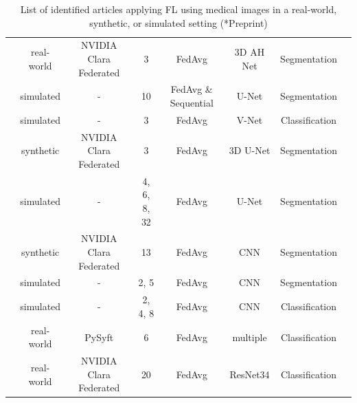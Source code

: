 \begin{table}
\begin{adjustbox}{width=1.0\textheight}
\begin{tabular}{cccccccc}
    \cite{Sarma2021FederatedSharing}                    & real-world & NVIDIA Clara Federated   & 3             & FedAvg                    & 3D AH Net         & Segmentation \\
    \cite{Sheller2020FederatedData}                     & simulated  & -                        & 10            & FedAvg \& Sequential      & U-Net             & Segmentation \\
    \cite{Baheti2020FederatedNodules}                   & simulated  & -                        & 3             & FedAvg                    & V-Net             & Classification \\    
    \cite{Yang2021FederatedJapan}                       & synthetic  & NVIDIA Clara Federated   & 3             & FedAvg                    & 3D U-Net          & Segmentation \\  
    \cite{Sheller2019Multi-institutionalSegmentation}   & simulated  & -                        & 4, 6, 8, 32   & FedAvg                    & U-Net             & Segmentation \\
    \cite{Li2019Privacy-preservingSegmentation}         & synthetic  & NVIDIA Clara Federated   & 13            & FedAvg                    & CNN               & Segmentation \\
    \cite{Andreux2020SiloedDatasets}                    & simulated  & -                        & 2, 5          & FedAvg                    & CNN               & Segmentation \\
    \cite{Yan2020Variation-AwareData}                   & simulated  & -                        & 2, 4, 8       & FedAvg                    & CNN               & Classification \\
    \cite{Lee2021FederatedEnvironment}                  & real-world & PySyft                   & 6             & FedAvg                    & multiple          & Classification \\
    \cite{Flores2021FederatedPatients}\rlap{*}          & real-world & NVIDIA Clara Federated   & 20            & FedAvg                    & ResNet34          & Classification \\
  \end{tabular}
  \end{adjustbox}
  \caption[Identified articles applying FL using medical image data]{List of identified articles applying FL using medical images in a real-world, synthetic, or simulated setting (*Preprint)}
  \label{tab:LitSearch}
\end{table}

